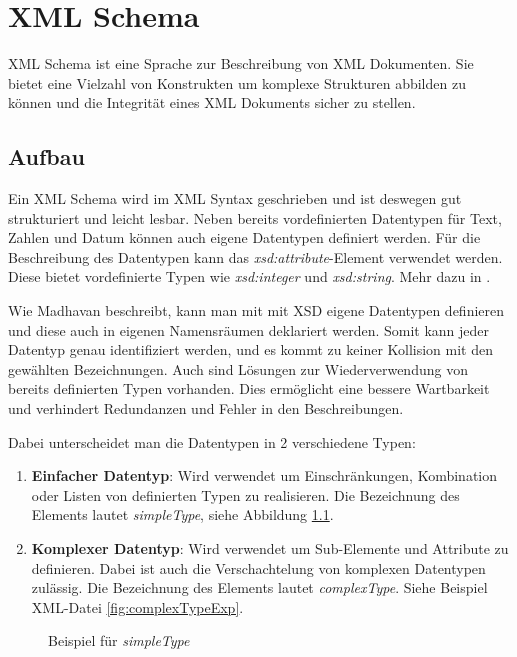 \chapter{XML Schema}
\label{cha:Schema}
XML Schema ist eine Sprache zur Beschreibung von XML Dokumenten. Sie bietet eine Vielzahl von Konstrukten um komplexe Strukturen abbilden zu können und die Integrität eines XML Dokuments sicher zu stellen.

\section{Aufbau}
Ein XML Schema wird im XML Syntax geschrieben und ist deswegen gut strukturiert und leicht lesbar.
Neben bereits vordefinierten Datentypen für Text, Zahlen und Datum können auch eigene Datentypen definiert werden. Für die Beschreibung des Datentypen kann das \emph{xsd:attribute}-Element verwendet werden. Diese bietet vordefinierte Typen wie \emph{xsd:integer} und \emph{xsd:string}. Mehr dazu in \cite{Wheeler2011}.

Wie Madhavan \cite{Madhavan2001} beschreibt, kann man mit mit XSD eigene Datentypen definieren und diese auch in eigenen Namensräumen deklariert werden. Somit kann jeder Datentyp genau identifiziert werden, und es kommt zu keiner Kollision mit den gewählten Bezeichnungen.
Auch sind Lösungen zur Wiederverwendung von bereits definierten Typen vorhanden. Dies ermöglicht eine bessere Wartbarkeit und verhindert Redundanzen und Fehler in den Beschreibungen.

Dabei unterscheidet man die Datentypen in 2 verschiedene Typen:

\begin{enumerate}
\item \textbf{Einfacher Datentyp}: Wird verwendet um Einschränkungen, Kombination oder Listen von definierten Typen zu realisieren. Die Bezeichnung des Elements lautet \emph{simpleType}, siehe Abbildung \ref{fig:simpleTypeExp}.
\item \textbf{Komplexer Datentyp}: Wird verwendet um Sub-Elemente und Attribute zu definieren. Dabei ist auch die Verschachtelung von komplexen Datentypen zulässig. Die Bezeichnung des Elements lautet \emph{complexType}. Siehe Beispiel XML-Datei \ref{fig:complexTypeExp}.
\end{enumerate}

\begin{figure}
\centering
{}
    
\caption{Beispiel für \emph{simpleType}  
}
\label{fig:simpleTypeExp}
\end{figure}

